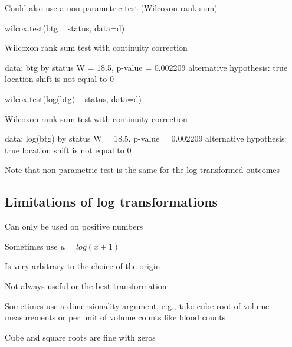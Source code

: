   \item Could also use a non-parametric test (Wilcoxon rank sum)
\begin{Schunk}
\begin{Sinput}
wilcox.test(btg ~ status, data=d)
\end{Sinput}
\begin{Soutput}

	Wilcoxon rank sum test with continuity correction

data:  btg by status
W = 18.5, p-value = 0.002209
alternative hypothesis: true location shift is not equal to 0
\end{Soutput}
\begin{Sinput}
wilcox.test(log(btg) ~ status, data=d)
\end{Sinput}
\begin{Soutput}

	Wilcoxon rank sum test with continuity correction

data:  log(btg) by status
W = 18.5, p-value = 0.002209
alternative hypothesis: true location shift is not equal to 0
\end{Soutput}
\end{Schunk}
  \item Note that non-parametric test is the same for the log-transformed outcomes
\ei


\subsection{Limitations of log transformations}
\bi
  \item Can only be used on positive numbers
   \bi
    \item Sometimes use $u = log(x+1)$
   \ei
  \item Is very arbitrary to the choice of the origin
  \item Not always useful or the best transformation
  \item Sometimes use a dimensionality argument, e.g., take cube root
    of volume measurements or per unit of volume counts like blood counts
  \item Cube and square roots are fine with zeros
\ei

